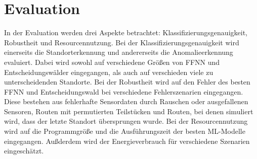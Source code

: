 \chapter{Evaluation}
In der Evaluation werden drei Aspekte betrachtet: Klassifizierungsgenauigkeit, Robustheit und Resourcennutzung.
Bei der Klassifizierungsgenauigkeit wird einerseits die Standorterkennung und andererseits die Anomalieerkennung evaluiert.
Dabei wird sowohl auf verschiedene Größen von FFNN und Entscheidungswälder eingegangen,
als auch auf verschieden viele zu unterscheidenden Standorte.
\newline
\newline
Bei der Robustheit wird auf den Fehler des besten FFNN und Entscheidungswald bei verschiedene Fehlerszenarien eingegangen.
Diese bestehen aus fehlerhafte Sensordaten durch Rauschen oder ausgefallenen Sensoren,
Routen mit permutierten Teilstücken und Routen, bei denen simuliert wird, dass der letzte Standort übersprungen wurde.
\newline
\newline
Bei der Resourcennutzung wird auf die Programmgröße und die Ausführungszeit der besten ML-Modelle eingegangen.
Außderdem wird der Energieverbrauch für verschiedene Szenarien eingeschätzt.




